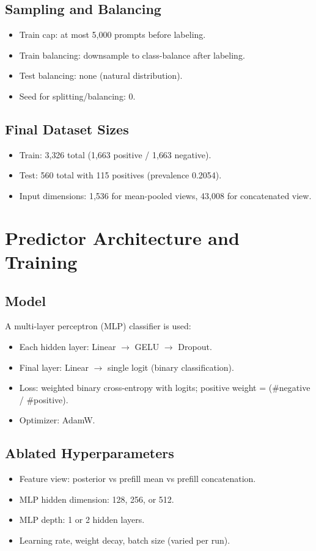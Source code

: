 \documentclass[11pt]{article}
\begin{document}
\subsection*{Sampling and Balancing}
\begin{itemize}
  \item Train cap: at most 5{,}000 prompts before labeling.
  \item Train balancing: downsample to class-balance after labeling.
  \item Test balancing: none (natural distribution).
  \item Seed for splitting/balancing: 0.
\end{itemize}

\subsection*{Final Dataset Sizes}
\begin{itemize}
  \item Train: 3{,}326 total (1{,}663 positive / 1{,}663 negative).
  \item Test: 560 total with 115 positives (prevalence 0.2054).
  \item Input dimensions: 1{,}536 for mean-pooled views, 43{,}008 for concatenated view.
\end{itemize}

\section*{Predictor Architecture and Training}
\subsection*{Model}
A multi-layer perceptron (MLP) classifier is used:
\begin{itemize}
  \item Each hidden layer: Linear $\rightarrow$ GELU $\rightarrow$ Dropout.
  \item Final layer: Linear $\rightarrow$ single logit (binary classification).
  \item Loss: weighted binary cross-entropy with logits; positive weight = (\#negative / \#positive).
  \item Optimizer: AdamW.
\end{itemize}

\subsection*{Ablated Hyperparameters}
\begin{itemize}
  \item Feature view: posterior vs prefill mean vs prefill concatenation.
  \item MLP hidden dimension: 128, 256, or 512.
  \item MLP depth: 1 or 2 hidden layers.
  \item Learning rate, weight decay, batch size (varied per run).
\end{itemize}
\end{document}
